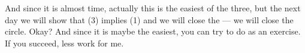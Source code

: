 \begin{spoken-clean}[00:29:34 - 00:29:59]
And since it is almost time, actually this is the easiest of the three, but the next day we will show that (3) implies (1) and we will close the --- we will close the circle. Okay? And since it is maybe the easiest, you can try to do as an exercise. If you succeed, less work for me. 
\end{spoken-clean}

